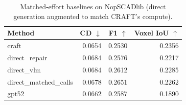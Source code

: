 \begin{table}[t]
\centering
\caption{Matched-effort baselines on NopSCADlib (direct generation augmented to match CRAFT's compute).}
\label{tab:matched_effort}
\begin{tabular}{lrrr}
\toprule
Method & CD $\downarrow$ & F1 $\uparrow$ & Voxel IoU $\uparrow$ \\
\midrule
craft & 0.0654 & 0.2530 & 0.2356 \\
direct\_repair & 0.0684 & 0.2576 & 0.2217 \\
direct\_vlm & 0.0684 & 0.2612 & 0.2285 \\
direct\_matched\_calls & 0.0678 & 0.2651 & 0.2262 \\
gpt52 & 0.0662 & 0.2587 & 0.1890 \\
\bottomrule
\end{tabular}
\end{table}
